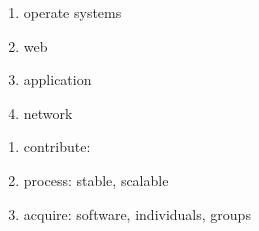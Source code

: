 \documentclass[draftclsnofoot,journal,onecolumn,12pt]{IEEEtran}
\begin{document}
\begin{enumerate}
  \item operate systems
  \item web
  \item application
  \item network
\end{enumerate}

\begin{enumerate}
  \item contribute:
  \item process: stable, scalable
  \item acquire: software, individuals, groups
\end{enumerate}


\nocite{Bonaccorsi20031243}
\nocite{chacon2009pro}
\nocite{Hertel20031159}
\nocite{kernighan1999practice}
\nocite{Kogut01062001}
\nocite{scacchi2006understanding}
\nocite{vonKrogh20031149}
\nocite{Yilmaz06techniquesand}

\nocite{Alvaro:2010:BAE:1755913.1755937}

\renewcommand\refname{References}


\end{document}
